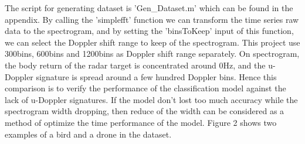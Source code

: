 \documentclass{cta-author}
\begin{document}
The script for generating dataset is 'Gen\_Dataset.m' which can be found in the appendix. By calling the 'simplefft' function we can transform the time series raw data to the spectrogram, and by setting the 'binsToKeep' input of this function, we can select the Doppler shift range to keep of the spectrogram.
This project use 300bins, 600bins and 1200bins as Doppler shift range separately. 
On spectrogram, the body return of the radar target is concentrated around 0Hz, and the u-Doppler signature is spread around a few hundred Doppler bins.
Hence this comparison is to verify the performance of the classification model against the lack of u-Doppler signatures. If the model don't lost too much accuracy while the spectrogram width dropping, then reduce of the width can be considered as a method of optimize the time performance of the model.
Figure 2 shows two examples of a bird and a drone in the dataset.
\end{document}
